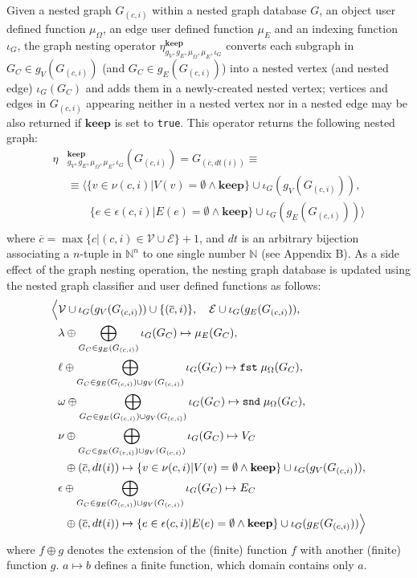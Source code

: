 \begin{definition}
Given a nested graph $G_{(c,i)}$ within a nested graph database $G$, an object user defined function $\mu_\Omega$, an edge user defined function $\mu_E$ and an indexing function $\iota_G$, the graph nesting operator $\eta_{g_V,g_E,\mu_\Omega,\mu_E,\iota_G}^{\textbf{keep}}$ converts each subgraph in $G_C\in g_V(G_{(c,i)})$ (and $G_C\in g_E(G_{(c,i)})$) into a nested vertex (and nested edge) $\iota_G(G_C)$ and adds them in a newly-created nested vertex; vertices and edges in $G_{(c,i)}$ appearing neither in a nested vertex nor in a nested edge may be also returned if $\textbf{keep}$ is set to \texttt{true}. This operator returns the following nested graph:
\[\begin{split}
\eta&{}_{g_V,g_E,\mu_\Omega,\mu_E,\iota_G}^{\textbf{keep}}(G_{(c,i)})=G_{(\overline{c},dt(i))}\equiv\\
&\equiv\Big\langle \{v\in \nu(c,i) | V(v)=\emptyset\wedge\textbf{keep} \}\cup \iota_G(g_V(G_{(c,i)})),\\
&\qquad \{e\in \epsilon(c,i) | E(e)=\emptyset\wedge\textbf{keep} \}\cup \iota_G(g_E(G_{(c,i)}))\Big\rangle\\
\end{split}\]
where $\overline{c}=\max\{c|(c,i)\in\mathcal{V}\cup\mathcal{E}\}+1$, and $dt$ is an arbitrary bijection associating a  $n$-tuple in $\mathbb{N}^n$ to one single number $\mathbb{N}$ (see Appendix B). As a side effect of the graph nesting operation, the nesting graph database is updated using the nested graph classifier and user defined functions as follows:
	\[\begin{split}
	\Big\langle&\mathcal{V}\cup \iota_G(g_V(G_{(c,i)}))\cup\{(\overline{c},i)\},\quad \mathcal{E}\cup \iota_G(g_E(G_{(c,i)})),\\
	& \lambda\oplus \bigoplus_{G_C\in g_E(G_{(c,i)})}\iota_G(G_C)\mapsto \mu_E(G_C),\\
	& \ell\oplus\bigoplus_{G_C\in g_E(G_{(c,i)})\cup g_V(G_{(c,i)})}\iota_G(G_C)\mapsto\texttt{fst}\;\mu_\Omega(G_C),\\
	& \omega\oplus\bigoplus_{G_C\in g_E(G_{(c,i)})\cup g_V(G_{(c,i)})}\iota_G(G_C)\mapsto\texttt{snd}\;\mu_\Omega(G_C),\\
	& \nu\oplus \bigoplus_{G_C\in g_E(G_{(c,i)})\cup g_V(G_{(c,i)})}\iota_G(G_C)\mapsto V_C\\
	& \;\; \oplus (\overline{c},dt(i))\mapsto \{v\in \nu(c,i) | V(v)=\emptyset\wedge\textbf{keep} \}\cup \iota_G(g_V(G_{(c,i)})), \\
	& \epsilon\oplus \bigoplus_{G_C\in g_E(G_{(c,i)})\cup g_V(G_{(c,i)})}\iota_G(G_C)\mapsto E_C\\
	& \;\; \oplus (\overline{c},dt(i))\mapsto\{e\in \epsilon(c,i) | E(e)=\emptyset\wedge\textbf{keep} \}\cup \iota_G(g_E(G_{(c,i)}))\Big\rangle\\
	\end{split}\]
	where $f\oplus g$ denotes the extension of the (finite) function $f$ with another (finite) function $g$. $a\mapsto b$ defines a finite function, which domain contains only $a$.
\end{definition}

